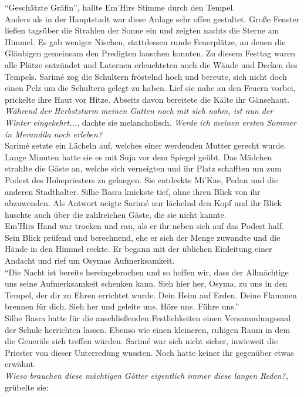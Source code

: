 ``Geschätzte Gräfin'', hallte Em'Hirs Stimme durch den Tempel.\\
Anders als in der Hauptstadt war diese Anlage sehr offen gestaltet. Große Fenster ließen tagsüber 
die Strahlen der Sonne ein und zeigten nachts die Sterne am Himmel. Es gab weniger Nischen, 
stattdessen runde Feuerplätze, an denen die Gläubigen gemeinsam den Predigten lauschen konnten. Zu 
diesem Festtag waren alle Plätze entzündet und Laternen erleuchteten auch die Wände und Decken des 
Tempels. Sarimé zog die Schultern fröstelnd hoch und bereute, sich nicht doch einen Pelz um die 
Schultern gelegt zu haben. Lief sie nahe an den Feuern vorbei, prickelte ihre Haut vor Hitze. 
Abseits davon bereitete die Kälte ihr Gänsehaut.\\
\textit{Während der Herbststurm meinen Gatten noch mit sich nahm, ist nun der Winter 
eingekehrt...}, dachte sie melancholisch. \textit{Werde ich meinen ersten Sommer in Merandila noch 
erleben?}\\
Sarimé setzte ein Lächeln auf, welches einer werdenden Mutter gerecht wurde. Lange Minuten hatte 
sie es mit Suja vor dem Spiegel geübt. Das Mädchen strahlte die Gäste an, welche sich verneigten 
und ihr Platz schafften um zum Podest des Hohepriesters zu gelangen. Sie entdeckte Mi'Kae, Pedan 
und die anderen Stadthalter. Silhe Basra knickste tief, ohne ihren Blick von ihr abzuwenden. Als 
Antwort neigte Sarimé nur lächelnd den Kopf und ihr Blick huschte auch über die zahlreichen Gäste, 
die sie nicht kannte.\\
Em'Hirs Hand war trocken und rau, als er ihr neben sich auf das Podest half. Sein Blick prüfend und 
berechnend, ehe er sich der Menge zuwandte und die Hände in den Himmel reckte. Er begann mit der 
üblichen Einleitung einer Andacht und rief um Osymas Aufmerksamkeit.\\
``Die Nacht ist bereits hereingebrochen und so hoffen wir, dass der Allmächtige uns seine 
Aufmerksamkeit schenken kann. Sieh hier her, Osyma, zu uns in den Tempel, der dir zu Ehren 
errichtet wurde. Dein Heim auf Erden. Deine Flammen brennen für dich. Sieh her und geleite uns. 
Höre uns. Führe uns.''\\
Silhe Basra hatte für die anschließenden Festlichkeiten einen Versammlungssaal der Schule 
herrichten lassen. Ebenso wie einen kleineren, ruhigen Raum in dem die Generäle sich treffen 
würden. Sarimé war sich nicht sicher, inwieweit die Priester von dieser Unterredung wussten. Noch 
hatte keiner ihr gegenüber etwas erwähnt.\\
\textit{Wieso brauchen diese mächtigen Götter eigentlich immer diese langen Reden?}, grübelte sie: 
